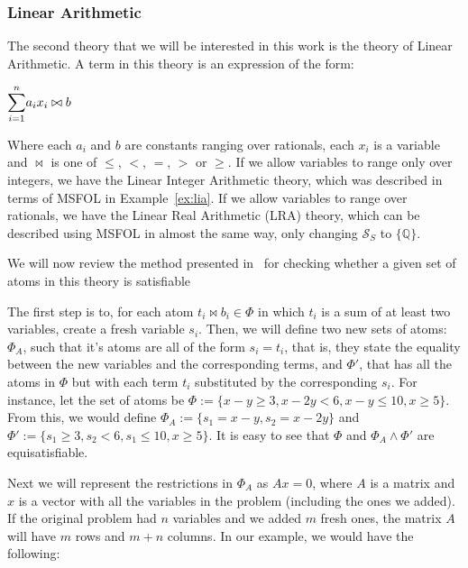 \subsubsection{Linear Arithmetic}

The second theory that we will be interested in this work is the theory of Linear Arithmetic. A term in this theory is an expression of the form:
\begin{center}
  $\mathlarger{\sum}_{i = 1}^{n} a_{i} x_{i} \bowtie b$
\end{center}

Where each $a_{i}$ and $b$ are constants ranging over rationals, each $x_{i}$ is a variable and $\bowtie$ is one of $\le$, $<$, $=$, $>$ or $\ge$. If we allow variables to range only over integers, we have the Linear Integer Arithmetic theory, which was described in terms of MSFOL in Example~\ref{ex:lia}. If we allow variables to range over rationals, we have the Linear Real Arithmetic (LRA) theory, which can be described using MSFOL in almost the same way, only changing $\mathcal{S}_{S}$ to $\{\mathbb{Q}\}$. 

We will now review the method presented in~\cite{simplex_dpllt} for checking whether a given set of atoms in this theory is satisfiable

The first step is to, for each atom $t_{i} \bowtie b_{i} \in \Phi$ in which $t_{i}$ is a sum of at least two variables, create a fresh variable $s_{i}$. Then, we will define two new sets of atoms: $\Phi_{A}$, such that it's atoms are all of the form $s_{i} = t_{i}$, that is, they state the equality between the new variables and the corresponding terms, and $\Phi'$, that has all the atoms in $\Phi$ but with each term $t_{i}$ substituted by the corresponding $s_{i}$. For instance, let the set of atoms be
$\Phi := \{x - y \ge 3, x - 2y < 6, x - y \le 10, x \ge 5\}$.  From this, we would define $\Phi_{A} := \{s_{1} = x - y, s_{2} = x - 2y\}$ and $\Phi' := \{s_{1} \ge 3, s_{2} < 6, s_{1} \le 10, x \ge 5\}$. It is easy to see that $\Phi$ and $\Phi_{A} \wedge \Phi'$ are equisatisfiable.

Next we will represent the restrictions in $\Phi_{A}$ as $Ax = 0$, where $A$ is a matrix and $x$ is a vector with all the variables in the problem (including the ones we added). If the original problem had $n$ variables and we added $m$ fresh ones, the matrix $A$ will have $m$ rows and $m + n$ columns. In our example, we would have the following:


